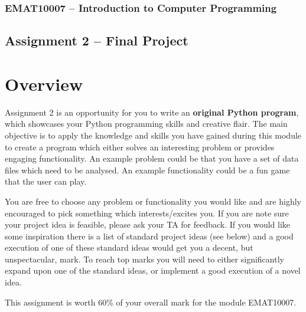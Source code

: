 \documentclass[12pt]{report}
\begin{document}
\subsubsection*{EMAT10007 -- Introduction to Computer Programming}
\subsection*{\Large Assignment 2 -- Final Project}

\section*{Overview}
Assignment 2 is an opportunity for you to write an \textbf{original Python program}, which showcases your Python programming skills and creative flair. The main objective is to apply the knowledge and skills you have gained during this module to create a program which either solves an interesting problem or provides engaging functionality. An example problem could be that you have a set of data files which need to be analysed. An example functionality could be a fun game that the user can play.

\bigskip

You are free to choose any problem or functionality you would like and are highly encouraged to pick something which interests/excites you. If you are note sure your project idea is feasible, please ask your TA for feedback. If you would like some inspiration there is a list of standard project ideas (see below) and a good execution of one of these standard ideas would get you a decent, but unspectacular, mark. To reach top marks you will need to either significantly expand upon one of the standard ideas, or implement a good execution of a novel idea.

\bigskip

This assignment is worth 60\% of your overall mark for the module EMAT10007.
\end{document}
